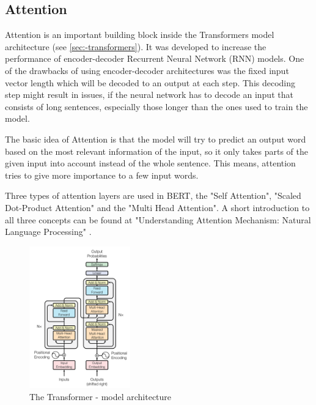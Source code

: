     
    
    \subsection{Attention}
    \label{sec:-attention}
    
    Attention is an important building block inside the Transformers model architecture (see \ref{sec:-transformers}).
    It was developed to increase the performance of encoder-decoder Recurrent Neural Network (RNN) models.
    One of the drawbacks of using encoder-decoder architectures was the fixed input vector length which will be decoded to an output at each step.
    This decoding step might result in issues, if the neural network has to decode an input that consists of long sentences, especially those longer than the ones used to train the model.

    The basic idea of Attention is that the model will try to predict an output word based on the most relevant information of the input, so it only takes parts of the given input into account instead of the whole sentence.
    This means, attention tries to give more importance to a few input words.

    Three types of attention layers are used in BERT, the "Self Attention", "Scaled Dot-Product Attention" and the "Multi Head Attention".
    A short introduction to all three concepts can be found at "Understanding Attention Mechanism: Natural Language Processing" \cite{understandingAttention}.

    \begin{figure}
        \caption{The Transformer - model architecture \cite[Figure 1 on page 3]{vaswani2017attention}}
        \begin{center}
            \includegraphics[width=0.39\textwidth]{figures/transformer_model_architecture.png}
        \end{center}
    \end{figure}
    
